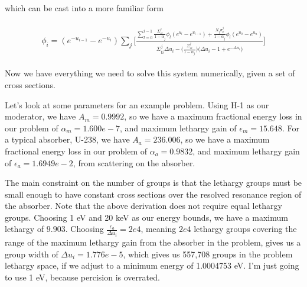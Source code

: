 \documentclass{article}
\begin{document}
        which can be cast into a more familiar form
        
        \begin{align}
        \begin{split}
            \label{eq:soln}
            \phi_i = 
            (e^{-u_{i-1}} - e^{-u_{i}}) 
            \sum_j \bigg[
            \frac{
                \sum_{l = 0}^{i-1} \frac{ \Sigma_{sl}^j }{1-\alpha_j}  \phi_l  
                (e^{u_l} - e^{u_{l-1}})  
                +
                 \frac{N_j  \sigma_{p}^j }{1-\alpha_j}  \phi_l  
                 (e^{u_0} - e^{u_n})   
            }
            {  
                \Sigma_{ti}^j  \Delta u_i  - 
                \big( \frac{ \Sigma_{si}^j }{1-\alpha_j}  \big)
            \big( \Delta u_i -1 + e^{-\Delta u_i} \big)  
             }
         \bigg]
        \end{split}
        \end{align}


        Now we have everything we need to solve this system numerically, given a set of cross sections.

        Let's look at some parameters for an example problem.
        Using H-1 as our moderator, we have 
        $A_m = 0.9992$, so we have a
        maximum fractional energy loss in our problem of $\alpha_m = 1.600e-7$, and 
        maximum lethargy gain of $\epsilon_m = 15.648$. 
        For a typical absorber, U-238, we have 
        $A_a = 236.006$, so we have a
        maximum fractional energy loss in our problem of $\alpha_a = 0.9832$, and 
        maximum lethargy gain of $\epsilon_a = 1.6949e-2$, from scattering on the absorber. 
        
        
        The main constraint on the number of groups is that the lethargy groups must be small
        enough to have constant cross sections over the resolved resonance region of the absorber.
        Note that the above derivation does not require equal lethargy groups.
        Choosing 1 eV and 20 keV as our energy bounds, we have a maximum lethargy of $9.903$.
        Choosing $\frac{\epsilon_a}{\Delta u_i} = 2e4$, meaning $2e4$ lethargy groups 
        covering the range of the maximum lethargy gain from the absorber in the problem, 
        gives us a group width of $\Delta u_i = 1.776e-5$,
        which gives us 557,708 groups in the problem lethargy space, if we adjust to a 
        minimum energy of 1.0004753 eV. 
        I'm just going to use 1 eV, because percision is overrated.
    
\end{document}
